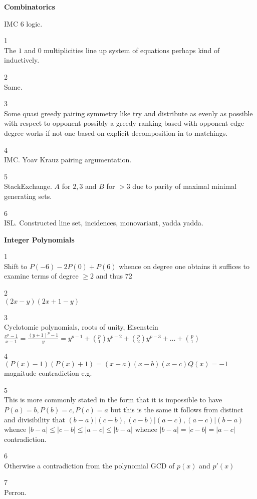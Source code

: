\newpage

\textbf{Combinatorics}

IMC $\boxed{6}$ logic.

1 \\
The $1$ and $0$ multiplicities line up system of equations perhaps kind of inductively.

2 \\
Same.

3 \\
Some quasi greedy pairing symmetry like try and distribute as evenly as possible with respect to opponent possibly a greedy ranking based with opponent edge degree works if not one based on explicit decomposition in to matchings.

4 \\
IMC. Yoav Krauz pairing argumentation.

5 \\
StackExchange. $A$ for $2,3$ and $B$ for $>3$ due to parity of maximal minimal generating sets.

6 \\
ISL. Constructed line set, incidences, monovariant, yadda yadda.

\newpage

\textbf{Integer Polynomials}

1 \\
Shift to $P(-6)-2P(0)+P(6)$ whence on degree one obtains it suffices to examine terms of degree $\ge 2$ and thus $\boxed{72}$

2 \\
$(2x-y)(2x+1-y)$

3 \\
Cyclotomic polynomials, roots of unity, Eisenstein $\frac{x^p-1}{x-1}=\frac{(y+1)^p-1}{y}=y^{p-1}+\binom{p}{1}y^{p-2}+\binom{p}{2}y^{p-3}+\dots+\binom{p}{1}$

4 \\
$(P(x)-1)(P(x)+1)=(x-a)(x-b)(x-c)Q(x)=-1$ magnitude contradiction e.g.

5 \\
This is more commonly stated in the form that it is impossible to have $P(a)=b, P(b)=c, P(c)=a$ but this is the same it follows from distinct and divisibility that $(b-a)|(c-b),(c-b)|(a-c),(a-c)|(b-a)$ whence $|b-a| \le |c-b| \le |a-c| \le |b-a|$ whence $|b-a|=|c-b|=|a-c|$ contradiction.

6 \\
Otherwise a contradiction from the polynomial GCD of $p(x)$ and $p'(x)$

7 \\
Perron.

